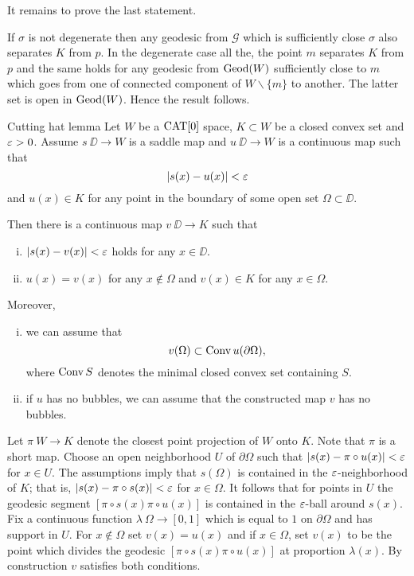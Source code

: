 \documentclass{article}
\begin{document}
It remains to prove the last statement.

If $\sigma$ is not degenerate then any geodesic from $\mathcal{G}$ which is sufficiently close $\sigma$ also separates $K$ from $p$.
In the degenerate case all the, 
the point $m$ separates $K$ from $p$ 
and the same holds for any geodesic from $\mathop{\rm Geod}\nolimits(W)$ sufficiently close to $m$ which goes from one of connected component of $W\backslash\{m\}$ to another.
The latter  set is open in $\mathop{\rm Geod}\nolimits(W)$.
Hence the result follows.
\qeds




\begin{thm}{Cutting hat lemma}\label{lem:cutting-hat}
Let 
$W$ be a $\mathop{\rm CAT}\nolimits[0]$ space, 
$K\subset W$ be a closed convex set 
and $\varepsilon>0$.
Assume $s\:\DD\to W$ is a saddle map 
and $u\:\DD\to W$ is a continuous map such that 
\[|s(x)-u(x)|<\varepsilon\]
and $u(x)\in K$ for any point in the boundary of some open set $\Omega\subset \DD$.

Then there is a continuous map $v\:\DD\to K$ such that 
\begin{enumerate}[(i)]
\item $|s(x)-v(x)|<\varepsilon$ holds for any $x\in\DD$.
\item $u(x)=v(x)$ for any $x\notin\Omega$ and
$v(x)\in K$ for any $x\in\Omega$.
\end{enumerate}

Moreover,
\begin{enumerate}[(i)]
\addtocounter{enumi}{2}
\item we can assume that \[v(\Omega)\subset \mathop{\rm Conv}\nolimits u(\partial\Omega),\]
where $\mathop{\rm Conv}\nolimits S$ denotes the minimal closed convex set containing $S$.
\item\label{lem:cutting-hat:b} if $u$ has no bubbles, we can assume that the constructed map $v$ has no bubbles.
\end{enumerate}
\end{thm}

Let $\pi\:W\to K$ denote the closest point projection of $W$ onto $K$.
Note that $\pi$
is a short map.
Choose an open neighborhood $U$ of $\partial \Omega$ such that 
$|s(x)-\pi\circ u(x)|<\varepsilon$ for $x\in U$.
The assumptions imply that $s(\Omega)$ is 
contained in the $\varepsilon$-neighborhood of $K$;
that is, $|s(x)-\pi\circ s(x)|<\varepsilon$ for $x\in\Omega$.
It follows that for points in $U$ the geodesic segment $[\pi\circ s(x)\pi\circ u(x)]$ is contained in the $\varepsilon$-ball
around $s(x)$.
Fix a continuous function $\lambda\:\Omega\to [0,1]$
which is equal to $1$ on $\partial \Omega$ and has support in $U$.
For $x\notin \Omega$ set $v(x)=u(x)$ and if 
$x\in \Omega$, set $v(x)$ to be the point which divides the geodesic $[\pi\circ s(x)\pi\circ u(x)]$
at proportion $\lambda(x)$.
By construction $v$ satisfies both conditions.
\end{document}
